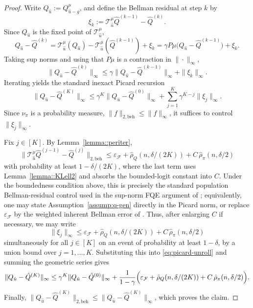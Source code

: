 \begin{proof}
Write \(Q_{\hat u}:=Q^\mu_{\hat u-g}\), and define the Bellman residual at step
\(k\) by
\[
\xi_k
:=
\mathcal T^\mu_{\hat u}\hat Q^{(k-1)}-\hat Q^{(k)}.
\]
Since \(Q_{\hat u}\) is the fixed point of \(\mathcal T^\mu_{\hat u}\),
\[
Q_{\hat u}-\hat Q^{(k)}
=
\mathcal T^\mu_{\hat u}(Q_{\hat u})
-\mathcal T^\mu_{\hat u}(\hat Q^{(k-1)})
+\xi_k
=
\gamma P\mu\bigl(Q_{\hat u}-\hat Q^{(k-1)}\bigr)+\xi_k.
\]
Taking sup norms and using that \(P\mu\) is a contraction in
\(\|\cdot\|_\infty\),
\[
\|Q_{\hat u}-\hat Q^{(k)}\|_\infty
\le
\gamma\|Q_{\hat u}-\hat Q^{(k-1)}\|_\infty
+\|\xi_k\|_\infty.
\]
Iterating yields the standard inexact Picard recursion
\begin{equation}
\label{eq:picard-unroll}
\|Q_{\hat u}-\hat Q^{(K)}\|_\infty
\le
\gamma^K\|Q_{\hat u}-\hat Q^{(0)}\|_\infty
+
\sum_{j=1}^K \gamma^{K-j}\|\xi_j\|_\infty.
\end{equation}
Since \(\nu_\pi\) is a probability measure,
\(\|f\|_{2,\mathrm{beh}}\le \|f\|_\infty\), it suffices to control
\(\|\xi_j\|_\infty\).

Fix \(j\in[K]\). By Lemma~\ref{lemma::periter},
\[
\|\mathcal T^\mu_{\hat u}\hat Q^{(j-1)}-\hat Q^{(j)}\|_{2,\mathrm{beh}}
\le
\varepsilon_{\mathcal F}
+\hat\rho_Q(n,\delta/(2K))
+ C\,\hat\rho_\pi(n,\delta/2)
\]
with probability at least \(1-\delta/(2K)\), where the last term uses
Lemma~\ref{lemma::KLell2} and absorbs the bounded-logit constant into \(C\).
Under the boundedness condition above, this is precisely the standard
population Bellman-residual control used in the sup-norm FQE argument of
\citet{munos2008finite}; equivalently, one may state
Assumption~\ref{assump:q-gen} directly in the Picard norm, or replace
\(\varepsilon_{\mathcal F}\) by the weighted inherent Bellman error of
\citet{van2025fitted}. Thus, after enlarging \(C\) if necessary, we may write
\[
\|\xi_j\|_\infty
\le
\varepsilon_{\mathcal F}
+\hat\rho_Q(n,\delta/(2K))
+ C\,\hat\rho_\pi(n,\delta/2)
\]
simultaneously for all \(j\in[K]\) on an event of probability at least
\(1-\delta\), by a union bound over \(j=1,\dots,K\). Substituting this into
\eqref{eq:picard-unroll} and summing the geometric series gives
\[
\|Q_{\hat u}-\hat Q^{(K)}\|_\infty
\le
\gamma^K\|Q_{\hat u}-\hat Q^{(0)}\|_\infty
+
\frac{1}{1-\gamma}
\Bigl(
\varepsilon_{\mathcal F}
+\hat\rho_Q(n,\delta/(2K))
+ C\,\hat\rho_\pi(n,\delta/2)
\Bigr).
\]
Finally,
\(
\|Q_{\hat u}-\hat Q^{(K)}\|_{2,\mathrm{beh}}
\le
\|Q_{\hat u}-\hat Q^{(K)}\|_\infty
\),
which proves the claim.
\end{proof}


